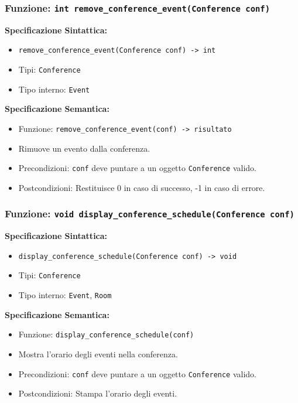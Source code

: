 \documentclass[11pt]{scrartcl} %
\begin{document}
\subsubsection{Funzione: \texttt{int remove\_conference\_event(Conference conf)}}

\textbf{Specificazione Sintattica:}
\begin{itemize}
\item \texttt{remove\_conference\_event(Conference conf) -> int}
\item Tipi: \texttt{Conference}
\item Tipo interno: \texttt{Event}
\end{itemize}

\textbf{Specificazione Semantica:}
\begin{itemize}
\item Funzione: \texttt{remove\_conference\_event(conf) -> risultato}
\item Rimuove un evento dalla conferenza.
\item Precondizioni: \texttt{conf} deve puntare a un oggetto \texttt{Conference} valido.
\item Postcondizioni: Restituisce 0 in caso di successo, -1 in caso di errore.
\end{itemize}

\subsubsection{Funzione: \texttt{void display\_conference\_schedule(Conference conf)}}

\textbf{Specificazione Sintattica:}
\begin{itemize}
\item \texttt{display\_conference\_schedule(Conference conf) -> void}
\item Tipi: \texttt{Conference}
\item Tipo interno: \texttt{Event}, \texttt{Room}
\end{itemize}

\textbf{Specificazione Semantica:}
\begin{itemize}
\item Funzione: \texttt{display\_conference\_schedule(conf)}
\item Mostra l'orario degli eventi nella conferenza.
\item Precondizioni: \texttt{conf} deve puntare a un oggetto \texttt{Conference} valido.
\item Postcondizioni: Stampa l'orario degli eventi.
\end{itemize}
\end{document}

